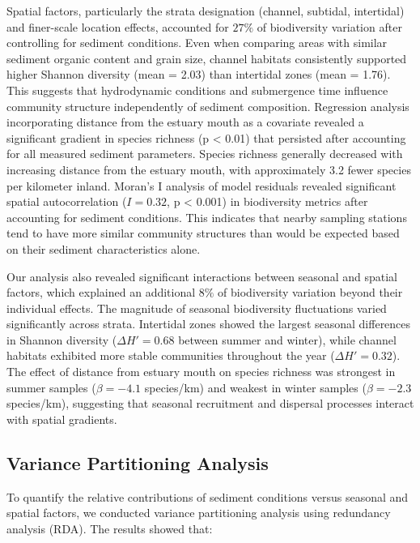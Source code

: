 \documentclass[12pt]{article}
\begin{document}
\qquad Spatial factors, particularly the strata designation (channel, subtidal,
intertidal) and finer-scale location effects, accounted for $27\%$ of
biodiversity variation after controlling for sediment conditions. Even when
comparing areas with similar sediment organic content and grain size, channel
habitats consistently supported higher Shannon diversity (mean = 2.03) than
intertidal zones (mean = 1.76). This suggests that hydrodynamic conditions and
submergence time influence community structure independently of sediment
composition. Regression analysis incorporating distance from the estuary mouth
as a covariate revealed a significant gradient in species richness (p < 0.01)
that persisted after accounting for all measured sediment parameters. Species
richness generally decreased with increasing distance from the estuary mouth,
with approximately 3.2 fewer species per kilometer inland. Moran's I analysis of
model residuals revealed significant spatial autocorrelation ($I = 0.32$, p <
0.001) in biodiversity metrics after accounting for sediment conditions. This
indicates that nearby sampling stations tend to have more similar community
structures than would be expected based on their sediment characteristics alone.

\qquad Our analysis also revealed significant interactions between seasonal and
spatial factors, which explained an additional $8\%$ of biodiversity variation
beyond their individual effects. The magnitude of seasonal biodiversity
fluctuations varied significantly across strata. Intertidal zones showed the
largest seasonal differences in Shannon diversity ($\Delta H' = 0.68$ between
summer and winter), while channel habitats exhibited more stable communities
throughout the year ($\Delta H' = 0.32$). The effect of distance from estuary
mouth on species richness was strongest in summer samples ($\beta = -4.1$
species/km) and weakest in winter samples ($\beta = -2.3$ species/km),
suggesting that seasonal recruitment and dispersal processes interact with
spatial gradients.

\subsection{Variance Partitioning Analysis}

To quantify the relative contributions of sediment conditions versus seasonal
and spatial factors, we conducted variance partitioning analysis using
redundancy analysis (RDA). The results showed that:
\end{document}
